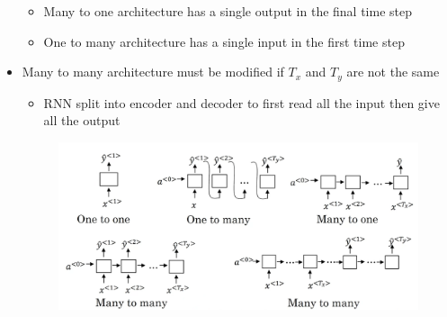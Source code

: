 \documentclass[12pt, letterpaper]{article}
\begin{document}
\begin{itemize}
        \begin{itemize}
            \item Many to one architecture has a single output in the final time step 
            \item One to many architecture has a single input in the first time step
        \end{itemize}
        \item Many to many architecture must be modified if $T_x$ and $T_y$ are not the same
        \begin{itemize}
            \item RNN split into encoder and decoder to first read all the input then give all the output
        \end{itemize}
        \begin{figure}[ht]
            \centering
            \includegraphics[width=16cm]{33.png}
        \end{figure}
    \end{itemize}
\end{document}
